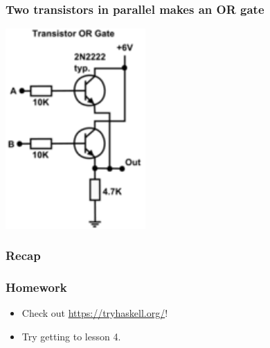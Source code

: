 \documentclass{beamer}
\begin{document}
\begin{frame}
  \frametitle{Two transistors in parallel makes an OR gate}

  \begin{center}
    \includegraphics[width=0.4\textwidth]{res/or-gate.png}
  \end{center}
\end{frame}

\begin{frame}
  \frametitle{Recap}
  \tableofcontents
\end{frame}

\begin{frame}
  \frametitle{Homework}

  \begin{itemize}
    \item
      Check out \url{https://tryhaskell.org/}!

    \item
      Try getting to lesson 4.
  \end{itemize}
\end{frame}
\end{document}
